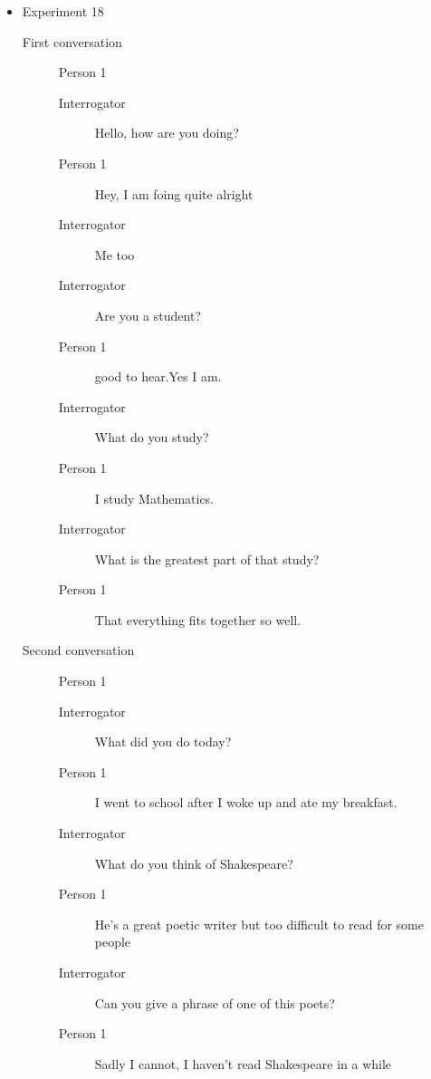 \begin{itemize}
   \item Experiment 18
      \begin{description}
         \item [First conversation] Person 1
            \begin{description}
               \item [Interrogator] Hello, how are you doing?
               \item [Person 1] Hey, I am foing quite alright
               \item [Interrogator] Me too
               \item [Interrogator] Are you a student?
               \item [Person 1] good to hear.Yes I am.
               \item [Interrogator] What do you study?
               \item [Person 1] I study Mathematics.
               \item [Interrogator] What is the greatest part of that study?
               \item [Person 1] That everything fits together so well.
            \end{description}
         \item [Second conversation] Person 1
            \begin{description}
               \item [Interrogator] What did you do today?
               \item [Person 1] I went to school after I woke up and ate my breakfast.
               \item [Interrogator] What do you think of Shakespeare?
               \item [Person 1] He's a great poetic writer but too difficult to read for some people
               \item [Interrogator] Can you give a phrase of one of this poets?
               \item [Person 1] Sadly I cannot, I haven't read Shakespeare in a while
            \end{description}
      \end{description}


\end{itemize}
